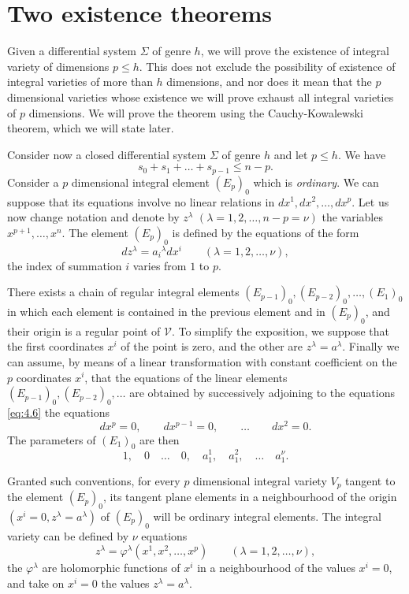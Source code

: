 \documentclass[leqno,11pt]{book}
\numberwithin{equation}{chapter}
\theoremstyle{shape1}
\theoremstyle{shape0}
\theoremstyle{shape2}
\theoremstyle{definition}
\begin{document}
\section{Two existence theorems}
\label{sec:two-theor-exist}

\fsec Given a differential system $\Sigma$ of genre $h$, we will prove the existence of integral variety of dimensions $p\le h$. This does not exclude the possibility of existence of integral varieties of more than $h$ dimensions, and nor does it mean that the $p$ dimensional varieties whose existence  we will prove exhaust all integral varieties of $p$ dimensions. We will prove the theorem using the Cauchy-Kowalewski theorem, which we will state later.


\vspace{12pt}\fsec Consider now a closed differential system $\Sigma$ of genre $h$ and let $p\le h$. We have
\[
s_{0}+s_{1}+\dots+s_{p-1}\le n-p.
\]
Consider a $p$ dimensional integral element $(E_{p})_{0}$ which is \emph{ordinary}. We can suppose that its equations involve no linear relations in $dx^{1},dx^{2},\dots,dx^{p}$. Let us now change  notation and denote by $z^{\lambda}$ $(\lambda=1,2,\dots,n-p=\nu)$ the variables $x^{p+1},\dots,x^{n}$. The element $(E_{p})_{0}$ is defined by the equations of the form
\begin{equation}
  \label{eq:4.6}
  dz^{\lambda}=a_{i}{}^{\lambda}dx^{i}\qquad(\lambda=1,2,\dots,\nu),
\end{equation}
the index of summation $i$ varies from $1$ to $p$.

There exists a chain of regular integral elements $(E_{p-1})_{0},(E_{p-2})_{0},\dots,(E_{1})_{0}$ in which each element is contained in the previous element and in $(E_{p})_{0}$, and their origin is a regular point of $\mathcal{V}$. To simplify the exposition, we suppose that the first coordinates $x^{i}$ of the point is zero, and the other are $z^{\lambda}=a^{\lambda}$. Finally we can assume, by means of a linear transformation with constant coefficient on the $p$ coordinates $x^{i}$, that the equations of the linear elements $(E_{p-1})_{0},(E_{p-2})_{0},\dots$ are obtained by successively adjoining to the equations \eqref{eq:4.6} the equations
\[
dx^{p}=0,\qquad dx^{p-1}=0,\qquad\dots\qquad dx^{2}=0.
\]
The parameters of $(E_{1})_{0}$ are then
\[
1,\quad 0\quad\dots\quad 0,\quad a^{1}_{1},\quad a^{2}_{1},\quad\dots\quad a^{\nu}_{1}.
\]

Granted such conventions, for every $p$ dimensional integral variety $V_{p}$ tangent to the element $(E_{p})_{0}$, its tangent plane elements in a neighbourhood of the origin $(x^{i}=0,z^{\lambda}=a^{\lambda})$ of $(E_{p})_{0}$ will be ordinary integral elements. The integral variety can be defined by $\nu$ equations
\begin{equation}
  \label{eq:4.7}
  z^{\lambda}=\varphi^{\lambda}(x^{1},x^{2},\dots,x^{p})\qquad (\lambda=1,2,\dots,\nu),
\end{equation}
the $\varphi^{\lambda}$ are holomorphic functions of $x^{i}$ in a neighbourhood of the values $x^{i}=0$, and take on $x^{i}=0$ the values $z^{\lambda}=a^{\lambda}$.
\end{document}

